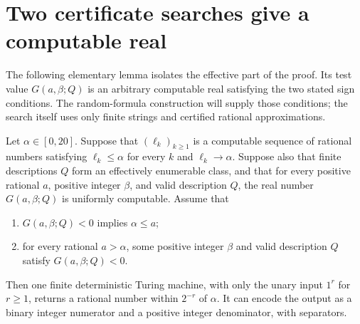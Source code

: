 \section{Two certificate searches give a computable real}\label{sec:certificates}

The following elementary lemma isolates the effective part of the proof.
Its test value $G(a,\beta;Q)$ is an arbitrary computable real satisfying
the two stated sign conditions. The random-formula construction will
supply those conditions; the search itself uses only finite strings and
certified rational approximations.

\begin{lemma}\label{cert:search}
Let $\alpha\in[0,20]$. Suppose that $(\ell_k)_{k\ge1}$ is a computable
sequence of rational numbers satisfying $\ell_k\le\alpha$ for every $k$
and $\ell_k\to\alpha$. Suppose also that finite descriptions $Q$ form
an effectively enumerable class, and that for every positive rational
$a$, positive integer $\beta$, and valid description $Q$, the real number
$G(a,\beta;Q)$ is uniformly computable. Assume that
\begin{enumerate}
\item $G(a,\beta;Q)<0$ implies $\alpha\le a$;
\item for every rational $a>\alpha$, some positive integer $\beta$ and
      valid description $Q$ satisfy $G(a,\beta;Q)<0$.
\end{enumerate}
Then one finite deterministic Turing machine, with only the unary input
$1^r$ for $r\ge1$, returns a rational number within $2^{-r}$ of $\alpha$.
It can encode the output as a binary integer numerator and a positive
integer denominator, with separators.
\end{lemma}

